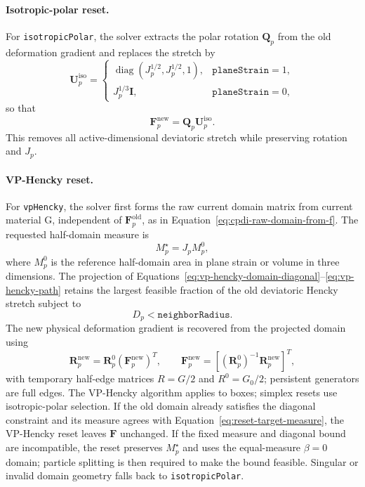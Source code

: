 \paragraph{Isotropic-polar reset.}
For \texttt{isotropicPolar}, the solver extracts the polar rotation $\mathbf{Q}_p$ from the old deformation gradient and replaces the stretch by
\begin{equation}
  \mathbf{U}^{\mathrm{iso}}_p =
  \begin{cases}
    \operatorname{diag}(J_p^{1/2},J_p^{1/2},1), & \texttt{planeStrain}=1,\\[3pt]
    J_p^{1/3}\mathbf{I}, & \texttt{planeStrain}=0,
  \end{cases}
\end{equation}
so that
\begin{equation}
  \mathbf{F}^{\mathrm{new}}_p=\mathbf{Q}_p\mathbf{U}^{\mathrm{iso}}_p.
  \label{eq:isotropic-polar-reset}
\end{equation}
This removes all active-dimensional deviatoric stretch while preserving rotation and $J_p$.

\paragraph{VP-Hencky reset.}
For \texttt{vpHencky}, the solver first forms the raw current domain matrix from current material G, independent of $\mathbf{F}^{\mathrm{old}}_p$, as in Equation~\eqref{eq:cpdi-raw-domain-from-f}.  The requested half-domain measure is
\begin{equation}
  M_p^{\star}=J_p M_p^0,
  \label{eq:reset-target-measure}
\end{equation}
where $M_p^0$ is the reference half-domain area in plane strain or volume in three dimensions.  The projection of Equations~\eqref{eq:vp-hencky-domain-diagonal}--\eqref{eq:vp-hencky-path} retains the largest feasible fraction of the old deviatoric Hencky stretch subject to
\begin{equation}
  D_p < \texttt{neighborRadius}.
\end{equation}
The new physical deformation gradient is recovered from the projected domain using
\begin{equation}
  \mathbf{R}^{\mathrm{new}}_p
  =\mathbf{R}^0_p(\mathbf{F}^{\mathrm{new}}_p)^T,
  \qquad
  \mathbf{F}^{\mathrm{new}}_p
  =\left[(\mathbf{R}^0_p)^{-1}\mathbf{R}^{\mathrm{new}}_p\right]^T,
  \label{eq:reset-f-from-domains}
\end{equation}
with temporary half-edge matrices $R=G/2$ and $R^0=G_0/2$; persistent generators are full edges. The VP-Hencky algorithm applies to boxes; simplex resets use isotropic-polar selection.  If the old domain already satisfies the diagonal constraint and its measure agrees with Equation~\eqref{eq:reset-target-measure}, the VP-Hencky reset leaves $\mathbf{F}$ unchanged.  If the fixed measure and diagonal bound are incompatible, the reset preserves $M_p^{\star}$ and uses the equal-measure $\beta=0$ domain; particle splitting is then required to make the bound feasible.  Singular or invalid domain geometry falls back to \texttt{isotropicPolar}.


